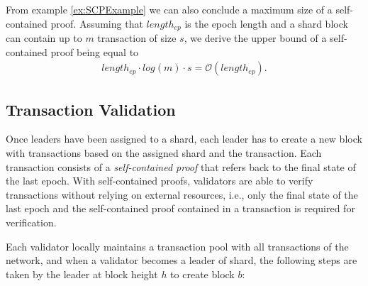 From example \ref{ex:SCPExample} we can also conclude a maximum size of a self-contained proof. Assuming that $length_{ep}$ is the epoch length and a shard block can contain up to $m$ transaction of size $s$, we derive the upper bound of a self-contained proof being equal to
\begin{gather}
  length_{ep} \cdot log(m) \cdot s = \mathcal{O}(length_{ep}).
\end{gather}

\subsection{Transaction Validation}
\label{Design:TransactionValidation}

Once leaders have been assigned to a shard, each leader has to create a new block with transactions based on the assigned shard and the transaction. Each transaction consists of a \textit{self-contained proof} that refers back to the final state of the last epoch. With self-contained proofs, validators are able to verify transactions without relying on external resources, i.e., only the final state of the last epoch and the self-contained proof contained in a transaction is required for verification. 

Each validator locally maintains a transaction pool with all transactions of the network, and when a validator becomes a leader of shard, the following steps are taken by the leader at block height $h$ to create block $b$:


